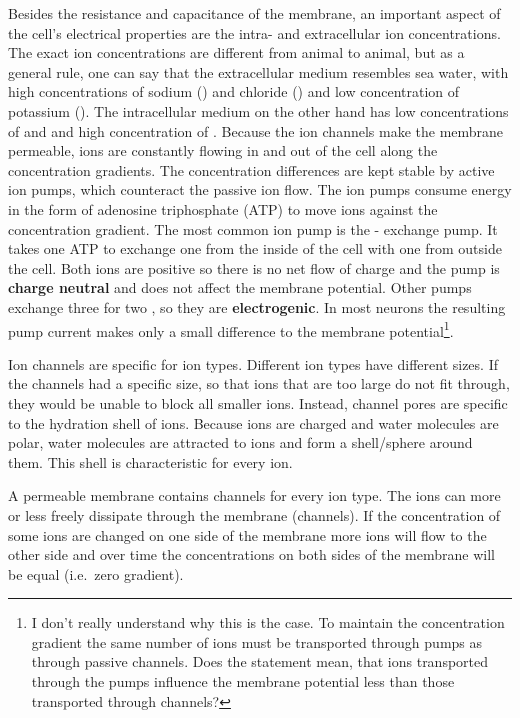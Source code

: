 Besides the resistance and capacitance of the membrane, an important aspect of the cell's electrical properties are the intra- and extracellular ion concentrations. The exact ion concentrations are different from animal to animal, but as a general rule, one can say that the extracellular medium resembles sea water, with high concentrations of sodium () and chloride () and low concentration of potassium (). The intracellular medium on the other hand has low concentrations of  and  and high concentration of . Because the ion channels make the membrane permeable, ions are constantly flowing in and out of the cell along the concentration gradients. The concentration differences are kept stable by active ion pumps, which counteract the passive ion flow. The ion pumps consume energy in the form of adenosine triphosphate (ATP) to move ions against the concentration gradient. The most common ion pump is the - exchange pump. It takes one ATP to exchange one  from the inside of the cell with one  from outside the cell. Both ions are positive so there is no net flow of charge and the pump is \textbf{charge neutral} and does not affect the membrane potential. Other pumps exchange three  for two , so they are \textbf{electrogenic}. In most neurons the resulting pump current makes only a small difference to the membrane potential\footnote{I don't really understand why this is the case. To maintain the concentration gradient the same number of ions must be transported through pumps as through passive channels. Does the statement mean, that ions transported through the pumps influence the membrane potential less than those transported through channels?}.

Ion channels are specific for ion types. Different ion types have different sizes. If the channels had a specific size, so that ions that are too large do not fit through, they would be unable to block all smaller ions. Instead, channel pores are specific to the hydration shell of ions. Because ions are charged and water molecules are polar, water molecules are attracted to ions and form a shell/sphere around them. This shell is characteristic for every ion.

A permeable membrane contains channels for every ion type. The ions can more or less freely dissipate through the membrane (channels). If the concentration of some ions are changed on one side of the membrane more ions will flow to the other side and over time the concentrations on both sides of the membrane will be equal (i.e.\ zero gradient).


